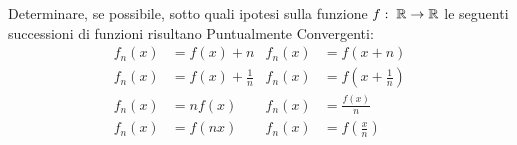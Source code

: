 \begin{exercise}
	Determinare, se possibile, sotto quali ipotesi sulla funzione $f:\; \mathbb{R} \to \mathbb{R}$ le seguenti successioni di funzioni risultano Puntualmente Convergenti:
	\begin{align*}
		f_n(x) &= f(x) + n & f_n(x) &= f(x + n)\\
		f_n(x) &= f(x) + \frac{1}{n} & f_n(x) &= f(x + \frac{1}{n})\\
		f_n(x) &= nf(x) & f_n(x) &= \frac{f(x)}{n}\\
		f_n(x) &= f(nx) & f_n(x) &= f(\frac{x}{n})
	\end{align*}
\end{exercise}

\cbstart
\begingroup
\renewcommand\theequation{\arabic{section}.\arabic{equation}}
\setcounter{equation}{0} %
